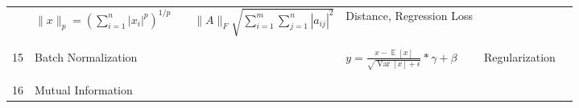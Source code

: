 \documentclass[twoside,twocolumn]{article}
\begin{document}
\begin{table}
{\begin{tabular}{p{0.2cm} p{6cm} p{12cm} p{6cm} p{4cm}}
      & $\displaystyle \| x  \|_p = \left( \sum_{i=1}^n |x_i|^p \right)^{1/p} \qquad \| A \|_F \sqrt{\sum_{i=1}^m \sum_{j=1}^n |a_{ij}|^2 }$
            & Distance, Regression Loss      &
    \\ \\ \\
    15 &  Batch Normalization
      & $\displaystyle y = \frac{x - \mathop{\mathbb{E}} \left[ x \right]}{\sqrt{\operatorname{Var}\left[ x \right] + \epsilon}} \ast \gamma + \beta$      & Regularization      &
    \\ \\ \\
    16 &  Mutual Information
      &       &       &
    \\
    \bottomrule
  \end{tabular}
  }
  \caption{}
  \label{}

\end{table}





\end{document}
